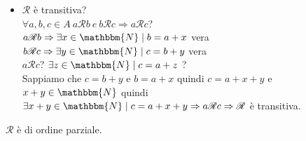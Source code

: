\documentclass[12pt, letterpaper]{report}
\begin{document}
\begin{enumerate}
\begin{itemize}
  				$a=b+y=a+x+y$, quindi $x+y=0 \Rightarrow x = y = 0 \in \mathbbm{N} \Rightarrow b = a + x = a + 0 = a \Rightarrow \mathscr{R}$ è antisimmetrica.
  				\item  $\mathscr{R}$ è transitiva? \\
  				$\forall a,b,c \in A \ a \mathscr{R}b \ e \ b\mathscr{R}c \Rightarrow a\mathscr{R}c$? \\
  				$a\mathscr{R}b \Rightarrow \exists x \in \mathbbm{N} \mid b = a + x$ vera \\
  				$b\mathscr{R}c \Rightarrow \exists y \in \mathbbm{N} \mid c = b + y$ vera \\
  				$a\mathscr{R}c$? $\exists z \in \mathbbm{N} \mid c = a + z$ ? \\
  				Sappiamo che $c = b + y$ e $b = a + x$ quindi $c = a + x + y$ e $x+y \in \mathbbm{N}$ quindi $\exists x+y \in \mathbbm{N} \mid c = a + x + y \Rightarrow a\mathscr{R}c \Rightarrow \mathscr{R}$ è transitiva.
  			\end{itemize}
  			$\mathscr{R}$ è di ordine parziale.
  		\end{enumerate}
\end{document}
